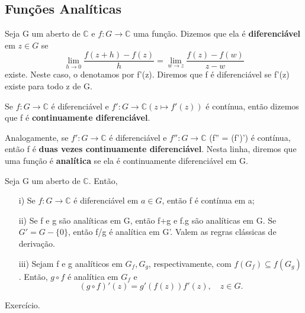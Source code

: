 \documentclass[ComplexAnalysis/complex.tex]{subfiles}
\begin{document}
\subsection{Funções Analíticas}
\begin{def*}
	Seja G um aberto de $\mathbb{C}$ e $f:G\rightarrow\mathbb{C}$ uma função. Dizemos que ela é \textbf{diferenciável}
	em $z\in{G}$ se
	$$
		\lim_{h\to{0}}\frac{f(z+h) - f(z)}{h} = \lim_{w\to{z}}\frac{f(z)-f(w)}{z-w}
	$$
	existe. Neste caso, o denotamos por f'(z). Diremos que f é diferenciável se f'(z) existe para todo z de G.
\end{def*}
\begin{def*}
	Se $f:G\rightarrow\mathbb{C}$ é diferenciável e $f':G\rightarrow\mathbb{C}(z\mapsto{f'(z)})$ é contínua,
	então dizemos que f é \textbf{continuamente diferenciável}.

	Analogamente, se $f':G\rightarrow\mathbb{C}$ é diferenciável e $f'':G\rightarrow\mathbb{C}$ (f'' = (f')') é
	contínua, então f é \textbf{duas vezes continuamente diferenciável}. Nesta linha, diremos que uma função é
	\textbf{analítica} se ela é continuamente diferenciável em G.
\end{def*}

\begin{prop*}
	Seja G um aberto de $\mathbb{C}$. Então,
	\begin{itemize}
		\item[i)] Se $f:G\rightarrow\mathbb{C}$ é diferenciável em $a\in{G}$, então f é contínua em a;
		\item[ii)] Se f e g são analíticas em G, então f+g e f.g são analíticas em G. Se $G' = G - \{0\}$,
		      então f/g é analítica em G'. Valem as regras clássicas de derivação.
		\item[iii)] Sejam f e g analíticos em $G_f, G_g$, respectivamente, com $f(G_f)\subseteq{f(G_g)}$. Então,
		      $g\circ f$ é analítica em $G_f$ e
		      $$
			      (g\circ f)'(z) = g'(f(z))f'(z), \quad z\in{G}.
		      $$
	\end{itemize}
\end{prop*}
\begin{proof*}
	Exercício.
	\qedsymbol
\end{proof*}
\end{document}
